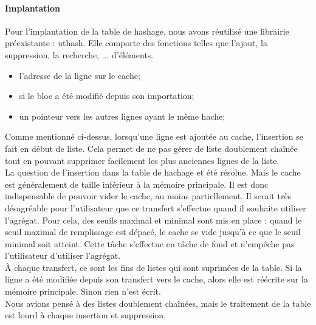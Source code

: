 \documentclass[a4paper,10pt]{article}
\begin{document}
\paragraph{Implantation}
Pour l'implantation de la table de hashage, nous avons réutilisé une librairie préexistante : uthash. Elle comporte des fonctions telles que l'ajout, la 
suppression, la recherche, ... d'éléments.
\begin{itemize}
 \item l'adresse de la ligne sur le cache;
 \item si le bloc a été modifié depuis son importation;
 \item un pointeur vers les autres lignes ayant le même hache;
\end{itemize}
Comme mentionné ci-dessus, lorsqu'une ligne est ajoutée au cache, l'insertion se fait en début de liste. Cela permet de ne pas gérer de liste doublement 
chaînée tout en pouvant supprimer facilement les plus anciennes lignes de la liste.\medskip\\
La question de l'insertion dans la table de hachage et été résolue. Mais le cache est généralement de taille inférieur à la mémoire principale. Il est donc 
indispensable de pouvoir vider le cache, au moins partiellement. Il serait très désagréable pour l'utilisateur que ce transfert s'effectue quand il 
souhaite utiliser l'agrégat. Pour cela, des seuils maximal et minimal sont mis en place : quand le seuil maximal de remplissage est dépacé, le cache se vide 
jusqu'à ce que le seuil minimal soit atteint. Cette tâche s'effectue en tâche de fond et n'empêche pas l'utilisateur d'utiliser l'agrégat.\medskip\\
À chaque transfert, ce sont les fins de listes qui sont suprimées de la table. Si la ligne a été modifiée depuis son transfert vers le cache, alors elle est 
réécrite sur la mémoire principale. Sinon rien n'est écrit.\medskip\\
Nous avions pensé à des listes doublement chaînées, mais le traitement de la table est lourd à chaque insertion et suppression.
\end{document}
